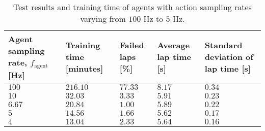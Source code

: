 \begin{table}[!htb]
\centering
\small
\begin{tabularx}{\textwidth}{RLLLL} 
    \hline
    \textbf{Agent sampling rate, $f_{\text{agent}}$ [Hz]} & \textbf{Training time [minutes]} & \textbf{Failed laps [\%]} & \textbf{Average lap time [s]} & \textbf{Standard deviation of lap time [s]}\\ 
    \hline
    $100$   & $216.10$  & $77.33$   & $8.17$  & $0.34$ \\      
    $10$    & $32.03$   & $3.33$    & $5.91$  & $0.23$ \\
    $6.67$  & $20.84$   & $1.00$    & $5.89$  & $0.22$ \\
    $5$     & $14.56$   & $1.66$    & $5.62$  & $0.17$ \\
    $4$     & $13.04$   & $2.33$    & $5.64$  & $0.16$ \\
    \hline
\end{tabularx}
\caption[Test results of agents with various action sampling rates]{Test results and training time of agents with action sampling rates varying from $100$ Hz to $5$ Hz.}
\label{tab:control_steps}
\end{table}
